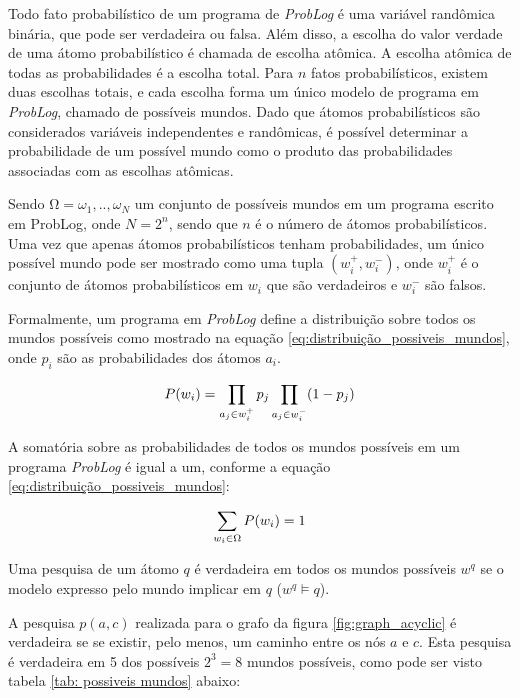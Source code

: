\documentclass[
	12pt,				%
    oneside,			%
	a4paper,			%
	english,			%
	french,				%
	spanish,			%
	brazil,				%
	]{abntex2}
\begin{document}
Todo fato probabilístico de um programa de \textit{ProbLog} é uma variável randômica binária, que pode ser verdadeira ou falsa. Além disso, a escolha do valor verdade de uma átomo probabilístico é chamada de escolha atômica. A escolha atômica de todas as probabilidades é a escolha total. Para $n$ fatos probabilísticos, existem duas escolhas totais, e cada escolha forma um único modelo de programa em \textit{ProbLog}, chamado de possíveis mundos. Dado que átomos probabilísticos são considerados variáveis independentes e randômicas, é possível determinar a probabilidade de um possível mundo como o produto das probabilidades associadas com as escolhas atômicas. 

Sendo $Ω = {ω_1, .., ω_N }$ um conjunto de possíveis mundos em um programa escrito em ProbLog, onde $N=2^n$, sendo que $n$ é o número de átomos probabilísticos. Uma vez que apenas átomos probabilísticos tenham probabilidades, um  único possível mundo pode ser mostrado como uma tupla $(w_i^+, w_i^-)$, onde $w_i^+$ é o conjunto de átomos probabilísticos em $w_i$ que são verdadeiros e $w_i^-$ são falsos.

Formalmente, um programa em \textit{ProbLog} define a distribuição sobre todos os mundos possíveis como mostrado na equação \ref{eq:distribuição_possiveis_mundos}, onde $p_i$ são as probabilidades dos átomos $a_i$.

\begin{equation}
\centering
    P(w_i)= \prod_{a_j\in w_i^+} p_j \prod_{a_j\in w_i^-} (1-p_j)
    \label{eq:distribuição_possiveis_mundos}
\end{equation}


A somatória sobre as probabilidades de todos os mundos possíveis em um programa \textit{ProbLog} é igual a um, conforme a equação \ref{eq:distribuição_possiveis_mundos}: 

\begin{equation}
\centering
    \sum_{w_i \in \Omega } {P(w_i)=1}
    \label{eq:distribuição_possiveis_mundos}
\end{equation}

Uma pesquisa de um átomo $q$ é verdadeira em todos os mundos possíveis $w^q$ se o modelo expresso pelo mundo implicar em $q$ ($w^q \models q$).

A pesquisa $p(a, c)$ realizada para o grafo da figura \ref{fig:graph_acyclic} é verdadeira se se existir, pelo menos, um caminho entre os nós $a$ e $c$. Esta pesquisa é verdadeira em 5 dos possíveis $2^3=8$ mundos possíveis, como pode ser visto tabela \ref{tab: possiveis mundos} abaixo:
\end{document}
